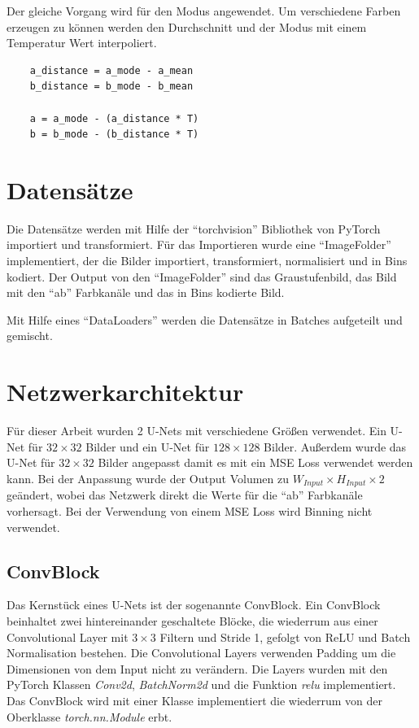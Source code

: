 Der gleiche Vorgang wird für den Modus angewendet. Um verschiedene Farben erzeugen zu können werden den Durchschnitt und der Modus mit einem
Temperatur Wert interpoliert.

\begin{listing}[H]
  \begin{verbatim}
    a_distance = a_mode - a_mean
    b_distance = b_mode - b_mean

    a = a_mode - (a_distance * T)
    b = b_mode - (b_distance * T)
  \end{verbatim}
\end{listing}

\section{Datensätze}
Die Datensätze werden mit Hilfe der ``torchvision'' Bibliothek von PyTorch importiert und transformiert. Für das Importieren wurde eine
``ImageFolder'' implementiert, der die Bilder importiert, transformiert, normalisiert und in Bins kodiert. Der Output von den ``ImageFolder''
sind das Graustufenbild, das Bild mit den ``ab'' Farbkanäle und das in Bins kodierte Bild.

Mit Hilfe eines ``DataLoaders'' werden die Datensätze in Batches aufgeteilt und gemischt.

\section{Netzwerkarchitektur}
Für dieser Arbeit wurden 2 U-Nets mit verschiedene Größen verwendet. Ein U-Net für $ 32 \times 32 $ Bilder und ein U-Net für $ 128 \times 128 $ 
Bilder. Außerdem wurde das U-Net für $ 32 \times 32 $ Bilder angepasst damit es mit ein MSE Loss verwendet werden kann. Bei der Anpassung wurde
der Output Volumen zu $ W_{Input} \times H_{Input} \times 2 $ geändert, wobei das Netzwerk direkt die Werte für die ``ab'' Farbkanäle vorhersagt.
Bei der Verwendung von einem MSE Loss wird Binning nicht verwendet.
 
\subsection{ConvBlock}
Das Kernstück eines U-Nets ist der sogenannte ConvBlock. Ein ConvBlock beinhaltet zwei hintereinander geschaltete Blöcke, die wiederrum
aus einer Convolutional Layer mit $3 \times 3$ Filtern und Stride 1, gefolgt von ReLU und Batch Normalisation bestehen. 
Die Convolutional Layers verwenden Padding um die Dimensionen von dem Input nicht zu verändern. Die Layers wurden mit den PyTorch 
Klassen \textit{Conv2d}, \textit{BatchNorm2d} und die Funktion \textit{relu} implementiert. Das ConvBlock wird mit einer Klasse implementiert
die wiederrum von der Oberklasse \textit{torch.nn.Module} erbt.

